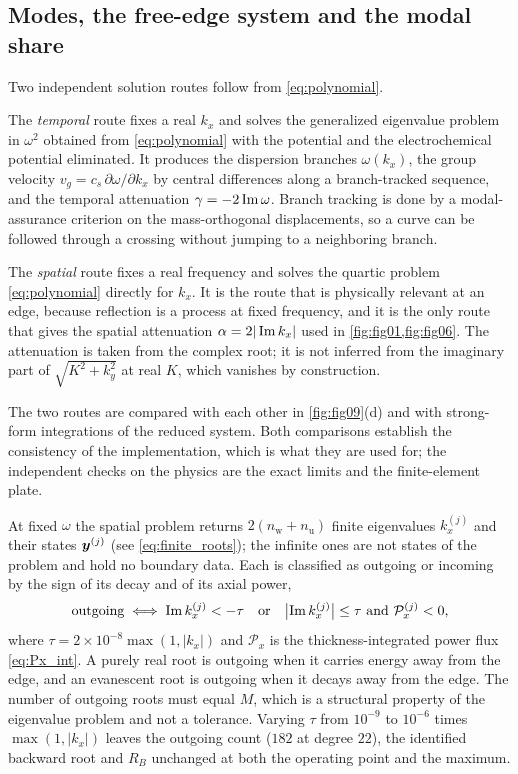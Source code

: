 \subsection{Modes, the free-edge system and the modal share}
\label{sec:numerics_routes}
\label{sec:numerics_edge}
\label{sec:numerics_admissibility}

Two independent solution routes follow from \eqref{eq:polynomial}.

The \emph{temporal} route fixes a real $k_x$ and solves the generalized
eigenvalue problem in $\omega^2$ obtained from \eqref{eq:polynomial} with the
potential and the electrochemical potential eliminated.  It produces the
dispersion branches $\omega(k_x)$, the group velocity
$v_g=c_s\,\partial\omega/\partial k_x$ by central differences along a
branch-tracked sequence, and the temporal attenuation
$\gamma=-2\operatorname{Im}\omega$.  Branch tracking is done by a modal-assurance
criterion on the mass-orthogonal displacements, so a curve can be followed
through a crossing without jumping to a neighboring branch.

The \emph{spatial} route fixes a real frequency and solves the quartic problem
\eqref{eq:polynomial} directly for $k_x$.  It is the route that is physically
relevant at an edge, because reflection is a process at fixed frequency, and it
is the only route that gives the spatial attenuation
$\alpha=2|\operatorname{Im} k_x|$ used in \cref{fig:fig01,fig:fig06}.  The attenuation is
taken from the complex root; it is not inferred from the imaginary part of
$\sqrt{K^2+k_y^2}$ at real $K$, which vanishes by construction.

The two routes are compared with each other in \cref{fig:fig09}(d) and with
strong-form integrations of the reduced system.  Both comparisons establish the consistency of
the implementation, which is what they are used for; the independent checks on
the physics are the exact limits and the finite-element plate.


At fixed $\omega$ the spatial problem returns $2(n_{\mathrm{w}}+n_{\mathrm u})$
finite eigenvalues $k_x^{(j)}$ and their states $\boldsymbol{y}^{(j)}$
(see \eqref{eq:finite_roots}); the infinite ones are not states of the problem and
hold no boundary data.  Each is classified as outgoing or incoming by the sign
of its decay and of its axial power,
\begin{equation}
\label{eq:classification}
\text{outgoing}\iff
\operatorname{Im} k_x^{(j)}<-\tau
\quad\text{or}\quad
\bigl|\operatorname{Im} k_x^{(j)}\bigr|\le\tau\ \text{and}\ \mathcal{P}_x^{(j)}<0 ,
\end{equation}
where $\tau=2\times10^{-8}\max(1,|k_x|)$ and $\mathcal{P}_x$ is the
thickness-integrated power flux \eqref{eq:Px_int}.  A purely real root is outgoing when it carries energy away from the edge, and an
evanescent root is outgoing when it decays away from the edge.  The number of
outgoing roots must equal $M$, which is a structural property of the
eigenvalue problem and not a tolerance.  Varying $\tau$ from $10^{-9}$ to $10^{-6}$ times $\max(1,|k_x|)$ leaves the outgoing count ($182$ at degree $22$), the identified backward root and $R_B$ unchanged at both the operating point and the maximum.

